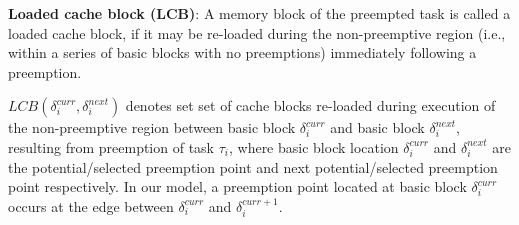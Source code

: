 \begin{definition}
\textbf{Loaded cache block (LCB)}: A memory block of the preempted task is called a loaded cache block, if it may be re-loaded during the non-preemptive region (i.e., within a series of basic blocks with no preemptions) immediately following a preemption.
\end{definition}
\noindent
\begin{math}\textit{LCB}(\delta_{i}^{curr},\delta_{i}^{next})\end{math} denotes set set of cache blocks re-loaded during execution of the non-preemptive region between basic block \begin{math}\delta_{i}^{curr}\end{math} and basic block \begin{math}\delta_{i}^{next}\end{math}, resulting from preemption of task \begin{math}\tau_{i}\end{math}, where basic block location \begin{math}\delta_{i}^{curr}\end{math} and \begin{math}\delta_{i}^{next}\end{math} are the potential/selected preemption point and next potential/selected preemption point respectively.  In our model, a preemption point located at basic block \begin{math}\delta_{i}^{curr}\end{math} occurs at the edge between \begin{math}\delta_{i}^{curr}\end{math} and \begin{math}\delta_{i}^{curr+1}\end{math}.

